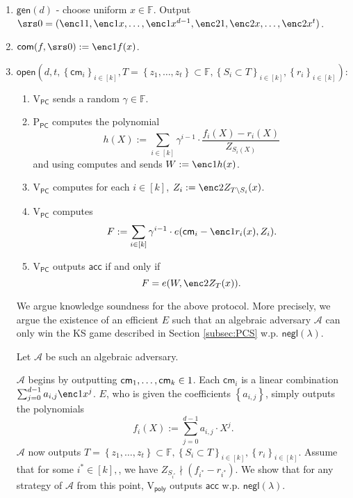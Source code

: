 \documentclass[11pt]{article} %
\newcommand{\F}{\ensuremath{\mathbb F}\xspace}
\newcommand{\adv}{\ensuremath{\mathcal A}\xspace}
\newcommand{\com}{\ensuremath{\mathsf{com}}\xspace}
\newcommand{\cm}{\ensuremath{\mathsf{cm}}\xspace}
\newcommand{\open}{\ensuremath{\mathsf{open}}\xspace}
\newcommand{\negl}{\ensuremath{\mathsf{negl}(\lambda)}\xspace}
\newcommand{\acc}{\ensuremath{\mathsf{acc}}\xspace}
\newcommand{\defeq}{:=}
\newcommand{\sett}[2]{\ensuremath{\set{#1}_{#2}}\xspace}
\newcommand{\gen}{\ensuremath{\mathsf{gen}}\xspace}
\newcommand{\prvpc}{\ensuremath{\mathrm{P_{\mathsf{PC}}}}\xspace}
\newcommand{\verpoly}{\ensuremath{\mathrm{V_{\mathsf{poly}}}}\xspace}
\newcommand{\verpc}{\ensuremath{\mathrm{V_{\mathsf{PC}}}}\xspace}
\newcommand{\ext}{\ensuremath{E}\xspace}
\newcommand{\set}[1]{\ensuremath{\left\{#1\right\}}\xspace}
\newcommand{\polysofdeg}[1]{\ensuremath{\F_{< #1}[X]}\xspace}
\begin{document}
\begin{enumerate}
 \item $\gen(d)$ - choose uniform $x\in \F$. Output $\srs0 =(\enc1{1},\enc1{x},\ldots,\enc1{x^{d-1}},\enc2{1},\enc2{x},\ldots,\enc2{x^t})$.
 \item $\com(f,\srs0) \defeq \enc1{f(x)}$.
 \item
 \noindent
 $\open\left(d,t,\sett{\cm_i}{i\in [k]},T=\set{z_1,\ldots,z_t}\subset \F,\sett{S_i\subset T}{i\in [k]},\sett{r_{i}}{i\in [k]}\right)$:
 \begin{enumerate}
  \item \verpc sends a random $\gamma\in \F$.
 \item \prvpc computes the polynomial
 \[h(X)\defeq \sum_{i\in [k]} \gamma^{i-1}\cdot \frac{f_i(X)-r_i(X)}{Z_{S_i(X)}}  \]
 and using  computes and sends $W\defeq \enc1{h(x)}$.
 \item\label{step:computeW} \verpc computes for each $i\in [k]$, $Z_i \defeq \enc2{Z_{T\setminus S_i}(x)}$.
 \item \verpc computes
 \[F\defeq \sum_{i\in [k]} \gamma^{i-1} \cdot e(\cm_i-\enc1{r_i(x)}, Z_i).\]
 \item \verpc outputs \acc if and only if
 \[ F = e(W,\enc2{Z_T(x)}).\]
 \end{enumerate}

 We argue knowledge soundness for the above protocol. More precisely, we argue the existence of an efficient \ext such that an algebraic adversary \adv can only win the KS game described in Section \ref{subsec:PCS} w.p. \negl.


 Let \adv be such an algebraic adversary.

 \adv begins by outputting $\cm_1,\ldots,\cm_k\in \G1$.
 Each $\cm_i$ is a linear combination $\sum_{j=0}^{d-1} a_{i,j} \enc1{x^j}$.
 \ext, who is given the coefficients \set{a_{i,j}}, simply outputs the polynomials
 \[f_i(X)\defeq \sum_{j=0}^{d-1} a_{i,j} \cdot X^j.\]
 \adv now outputs $T=\set{z_1,\ldots,z_t}\subset \F,\sett{S_i\subset T}{i\in [k]},\sett{r_{i}}{i\in [k]}$.
  Assume that for some $i^*\in [k],$, we have $Z_{S_{i^*}}\nmid (f_{i^*}- r_{i^*})$. We show that for any strategy of \adv from this point, \verpoly outputs \acc w.p. \negl.


\end{enumerate}
\end{document}
